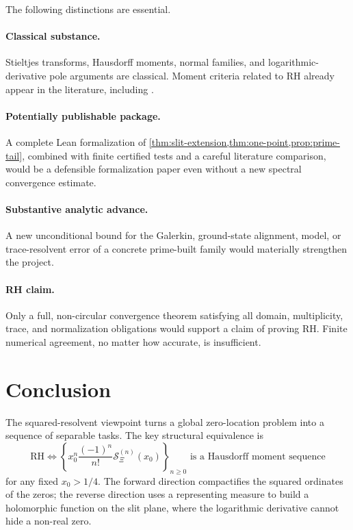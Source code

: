 \documentclass[11pt]{article}
\theoremstyle{definition}
\newcommand{\XiR}{\mathcal S_{\Xi}}
\newcommand{\RH}{\mathrm{RH}}
\begin{document}
The following distinctions are essential.

\paragraph{Classical substance.}
Stieltjes transforms, Hausdorff moments, normal families, and logarithmic-derivative pole
arguments are classical. Moment criteria related to RH already appear in the literature,
including \cite{Zhang2023}.

\paragraph{Potentially publishable package.}
A complete Lean formalization of \cref{thm:slit-extension,thm:one-point,prop:prime-tail},
combined with finite certified tests and a careful literature comparison, would be a
defensible formalization paper even without a new spectral convergence estimate.

\paragraph{Substantive analytic advance.}
A new unconditional bound for the Galerkin, ground-state alignment, model, or trace-resolvent
error of a concrete prime-built family would materially strengthen the project.

\paragraph{RH claim.}
Only a full, non-circular convergence theorem satisfying all domain, multiplicity, trace,
and normalization obligations would support a claim of proving RH. Finite numerical agreement,
no matter how accurate, is insufficient.

\section{Conclusion}

The squared-resolvent viewpoint turns a global zero-location problem into a sequence of
separable tasks. The key structural equivalence is
\[
 \boxed{
 \RH
 \iff
 \left\{
 x_0^n\frac{(-1)^n}{n!}\XiR^{(n)}(x_0)
 \right\}_{n\ge0}
 \text{ is a Hausdorff moment sequence}
 }
\]
for any fixed $x_0>1/4$. The forward direction compactifies the squared ordinates of the
zeros; the reverse direction uses a representing measure to build a holomorphic function on
the slit plane, where the logarithmic derivative cannot hide a non-real zero.
\end{document}
